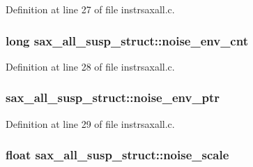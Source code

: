 Definition at line 27 of file instrsaxall.\+c.

\subsubsection[{\texorpdfstring{noise\+\_\+env\+\_\+cnt}{noise_env_cnt}}]{\setlength{\rightskip}{0pt plus 5cm}long sax\+\_\+all\+\_\+susp\+\_\+struct\+::noise\+\_\+env\+\_\+cnt}\hypertarget{structsax__all__susp__struct_ae586a3ae44f66cecbd89b0c68a4198e9}{}\label{structsax__all__susp__struct_ae586a3ae44f66cecbd89b0c68a4198e9}


Definition at line 28 of file instrsaxall.\+c.

\subsubsection[{\texorpdfstring{noise\+\_\+env\+\_\+ptr}{noise_env_ptr}}]{ sax\+\_\+all\+\_\+susp\+\_\+struct\+::noise\+\_\+env\+\_\+ptr}\hypertarget{structsax__all__susp__struct_a98c90436717cf4fa9f2798fa51d9fb25}{}\label{structsax__all__susp__struct_a98c90436717cf4fa9f2798fa51d9fb25}


Definition at line 29 of file instrsaxall.\+c.

\subsubsection[{\texorpdfstring{noise\+\_\+scale}{noise_scale}}]{\setlength{\rightskip}{0pt plus 5cm}float sax\+\_\+all\+\_\+susp\+\_\+struct\+::noise\+\_\+scale}\hypertarget{structsax__all__susp__struct_ad5eee920c01e4d961e9b12b72e3403d9}{}\label{structsax__all__susp__struct_ad5eee920c01e4d961e9b12b72e3403d9}


